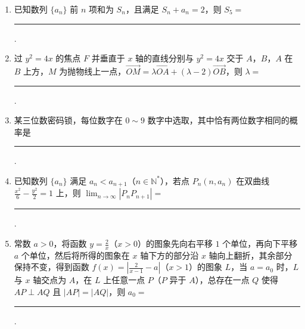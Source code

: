 \begin{description}
\begin{enumerate}[leftmargin=5pt]
        \item 已知数列 \(\{a_n\}\) 前 \(n\) 项和为 \(S_n\)，且满足 \(S_n+a_n=2\)，则 \(S_5=\)\rule[-0.3ex]{3em}{0.4pt}.

        \item 过 \(y^2=4x\) 的焦点 \(F\) 并垂直于 \(x\) 轴的直线分别与 \(y^2=4x\) 交于 \(A\)，\(B\)，\(A\) 在 \(B\) 上方，\(M\) 为抛物线上一点，\(\overrightarrow{OM}=\lambda\overrightarrow{OA}+(\lambda-2)\overrightarrow{OB}\)，则 \(\lambda=\)\rule[-0.3ex]{3em}{0.4pt}.

        \item 某三位数密码锁，每位数字在 \(0\sim9\) 数字中选取，其中恰有两位数字相同的概率是\rule[-0.3ex]{3em}{0.4pt}.

        \item 已知数列 \(\{a_n\}\) 满足 \(a_n<a_{n+1}\)（\(n\in\mathbb{N}^*\)），若点 \(P_n(n,a_n)\) 在双曲线 \(\frac{x^2}{6}-\frac{y^2}{2}=1\) 上，则 \(\displaystyle\lim_{n\to\infty}|P_nP_{n+1}|=\)\rule[-0.3ex]{3em}{0.4pt}.

        \item 常数 \(a>0\)，将函数 \(y=\frac2x\)（\(x>0\)）的图象先向右平移 \(1\) 个单位，再向下平移 \(a\) 个单位，然后将所得的图象在 \(x\) 轴下方的部分沿 \(x\) 轴向上翻折，其余部分保持不变，得到函数 \(f(x)=\left|\frac2{x-1}-a\right|\)（\(x>1\)）的图象 \(L\)，当 \(a=a_0\) 时，\(L\) 与 \(x\) 轴交点为 \(A\)，在 \(L\) 上任意一点 \(P\)（\(P\) 异于 \(A\)），总存在一点 \(Q\) 使得 \(AP\perp AQ\) 且 \(|AP|=|AQ|\)，则 \(a_0=\)\rule[-0.3ex]{3em}{0.4pt}.

    \end{enumerate}

\end{description}

